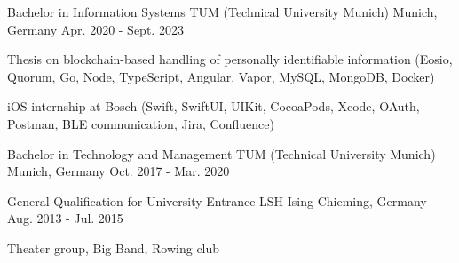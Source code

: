 


\begin{cventries}

\cventry
{Bachelor in Information Systems} %
{TUM (Technical University Munich)} %
{Munich, Germany} %
{Apr. 2020 - Sept. 2023} %
{ %
\begin{cvitems}
\item {Thesis on blockchain-based handling of personally identifiable information (Eosio, Quorum, Go, Node, TypeScript, Angular, Vapor, MySQL, MongoDB, Docker)}
\item {iOS internship at Bosch (Swift, SwiftUI, UIKit, CocoaPods, Xcode, OAuth, Postman, BLE communication, Jira, Confluence)}
\end{cvitems}
}

\cventry
{Bachelor in Technology and Management} %
{TUM (Technical University Munich)} %
{Munich, Germany} %
{Oct. 2017 - Mar. 2020} %
{ %
\begin{cvitems}
\end{cvitems}
}

\cventry
{General Qualification for University Entrance} %
{LSH-Ising} %
{Chieming, Germany} %
{Aug. 2013 - Jul. 2015} %
{ %
\begin{cvitems}
\item {Theater group, Big Band, Rowing club}
\end{cvitems}
}



\end{cventries}
